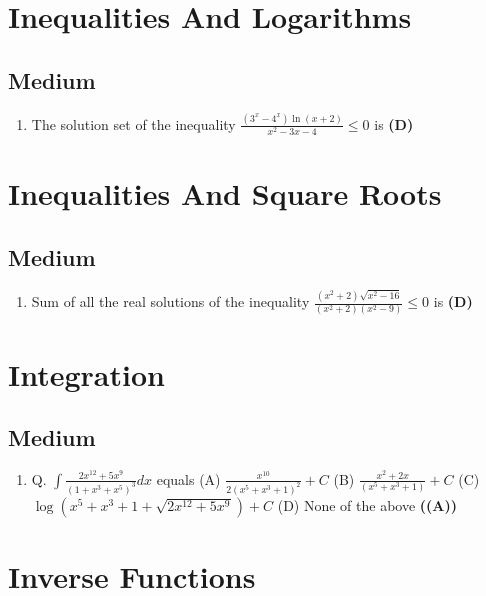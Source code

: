 \documentclass{article}
\begin{document}
\section{Inequalities And Logarithms}
\subsection{Medium}
\begin{enumerate}
\item The solution set of the inequality $\frac{(3^x - 4^x) \ln(x + 2)}{x^2 - 3x - 4} \leq 0$ is \hfill \textbf{(D)}
\end{enumerate}
\section{Inequalities And Square Roots}
\subsection{Medium}
\begin{enumerate}
\item Sum of all the real solutions of the inequality $\frac{(x^2 + 2) \sqrt{x^2 - 16}}{(x^2 + 2) (x^2 - 9)} \leq 0$ is \hfill \textbf{(D)}
\end{enumerate}
\section{Integration}
\subsection{Medium}
\begin{enumerate}
\item Q. $\int \frac{2x^{12}+5x^9}{(1+x^3+x^5)^3} dx$ equals
(A) $\frac{x^{10}}{2(x^5+x^3+1)^2} + C$
(B) $\frac{x^2+2x}{(x^5+x^3+1)} + C$
(C) $\log(x^5+x^3+1 + \sqrt{2x^{12}+5x^9}) + C$
(D) None of the above \hfill \textbf{((A))}
\end{enumerate}
\section{Inverse Functions}
\end{document}
